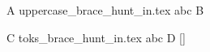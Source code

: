 \documentclass{article}
\begin{document}
A \@@input uppercase_brace_hunt_in.tex {abc} B

C \@@input toks_brace_hunt_in.tex {abc} D [\the{}]
\end{document}
